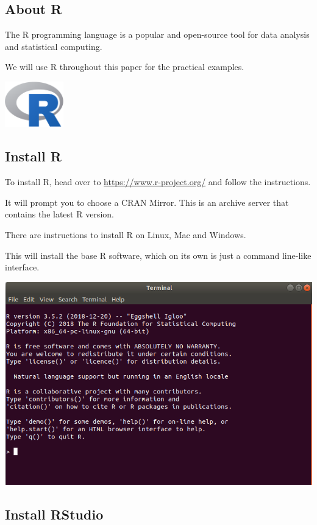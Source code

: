 \documentclass[]{book}
\begin{document}
\subsection{About R}\label{about-r}

The R programming language \citep{R-base} is a popular and open-source
tool for data analysis and statistical computing.

We will use R throughout this paper for the practical examples.

\includegraphics[width=1in]{img/R}

\subsection{Install R}\label{install-r}

To install R, head over to \url{https://www.r-project.org/} and follow
the instructions.

It will prompt you to choose a CRAN Mirror. This is an archive server
that contains the latest R version.

There are instructions to install R on Linux, Mac and Windows.

This will install the base R software, which on its own is just a
command line-like interface.

\includegraphics[width=6.02in]{img/R_cmd}

\subsection{Install RStudio}\label{install-rstudio}
\end{document}
